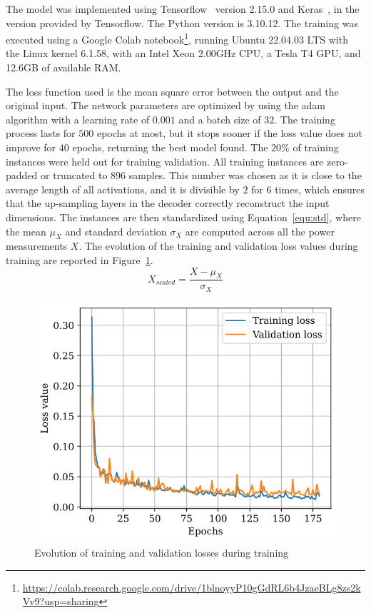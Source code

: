 The model was implemented using Tensorflow~\parencite{abadiTensorFlowLargeScaleMachine2016,tensorflowdevelopersTensorFlow2023} version 2.15.0 and Keras~\parencite{cholletKeras2015}, in the version provided by Tensorflow. The Python version is 3.10.12. The training was executed using a Google Colab notebook\footnote{\url{https://colab.research.google.com/drive/1blnoyyP10gGdRL6b4JzaeBLg8zs2kVv9?usp=sharing}}, running Ubuntu 22.04.03 LTS with the Linux kernel 6.1.58, with an Intel Xeon 2.00GHz CPU, a Tesla T4 GPU, and 12.6GB of available RAM.\@

The loss function used is the mean square error between the output and the original input. The network parameters are optimized by using the \acrfull{adam} algorithm with a learning rate of \(0.001\) and a batch size of \(32\). The training process lasts for \(500\) epochs at most, but it stops sooner if the loss value does not improve for \(40\) epochs, returning the best model found. The \(20\% \) of training instances were held out for training validation. All training instances are zero-padded or truncated to \(896\) samples. This number was chosen as it is close to the average length of all activations, and it is divisible by \(2\) for \(6\) times, which ensures that the up-sampling layers in the decoder correctly reconstruct the input dimensions. The instances are then standardized using Equation~\eqref{equ:std}, where the mean \(\mu_X\) and standard deviation \(\sigma_X\) are computed across all the power measurements \(X\). The evolution of the training and validation loss values during training are reported in Figure~\ref{fig:autoencoder_losses}.
\begin{equation}\label{equ:std}
  X_{scaled} = \frac{X - \mu_X}{\sigma_X}
\end{equation}

\begin{figure}
  \centering
  \includegraphics[width=.51\linewidth]{images/modes_clustering/loss.png}
  \caption{Evolution of training and validation losses during training}%
  \label{fig:autoencoder_losses}
\end{figure}

